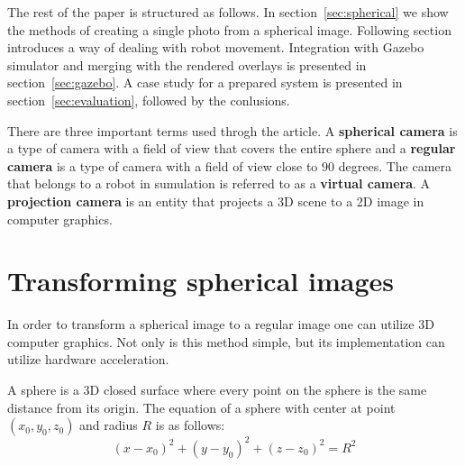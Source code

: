 \documentclass{svproc}
\begin{document}
The rest of the paper is structured as follows. In section~\ref{sec:spherical} we show the methods of creating
a single photo from a spherical image. Following section introduces a way of dealing with robot movement.
Integration with Gazebo simulator and merging with the rendered overlays is presented in section~\ref{sec:gazebo}.
A case study for a prepared system is presented in section~\ref{sec:evaluation}, followed by the conlusions.




There are three important terms used throgh the article. A \textbf{spherical camera} is a type of camera with a field of view that covers the entire sphere and a \textbf{regular camera} is a type of camera with a field of view close to $90$ degrees.
The camera that belongs to a robot in sumulation is referred to as a \textbf{virtual camera}.
A \textbf{projection camera} is an entity that projects a 3D scene to a 2D image in computer graphics.




\section{Transforming spherical images}

In order to transform a spherical image to a regular image one can utilize 3D computer graphics.
Not only is this method simple, but its implementation can utilize hardware acceleration.

A sphere is a 3D closed surface where every point on the sphere is the same distance from its origin.
The equation of a sphere with center at point $(x_0, y_0, z_0)$ and radius $R$ is as follows:
\begin{equation}
    (x - x_0)^2 + (y - y_0)^2 + (z - z_0)^2 = R^2
\end{equation}
\end{document}
